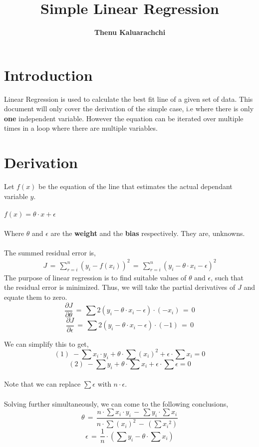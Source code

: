 \documentclass{article}
\title{\textbf{Simple Linear Regression}}
\author{\textbf{Thenu Kaluarachchi}}
\date{}
\begin{document}
\maketitle

\section{Introduction}
\noindent
Linear Regression is used to calculate the best fit line of a given set of data. This document will only cover the derivation of the simple case, i.e where there is only \textbf{one} independent variable. However the equation can be iterated over multiple times in a loop where there are multiple variables.

\section{Derivation}
Let $f(x)$ be the equation of the line that estimates the actual dependant variable $y$.
\\\\
\begin{math}
f(x) = \theta\cdot x + \epsilon
\end{math}
\\\\
Where $\theta$ and $\epsilon$ are the \textbf{weight} and the \textbf{bias} respectively. They are, unknowns.
\\\\
The summed residual error is,
\begin{align}
    J\, = \, \sum_{r=i}^n{(y_i-f(x_i))^2}\,=\, \sum_{r=i}^n{(y_i - \theta\cdot x_i - \epsilon)^2}
\end{align}
The purpose of linear regression is to find suitable values of $\theta$ and $\epsilon$, such that the residual error is minimized. Thus, we will take the partial derivatives of $J$ and equate them to zero.
$$
    \frac{\partial J}{\partial \theta}\, = \, \sum{2(y_i -\theta\cdot x_i - \epsilon)\cdot (-x_i)}\, = \,0 
$$
$$
    \frac{\partial J}{\partial \epsilon}\, = \, \sum{2(y_i -\theta\cdot x_i - \epsilon)\cdot (-1)}\, = \,0
    
$$

We can simplify this to get,
$$
(1)\; -\sum{x_i\cdot y_i} + \theta\cdot\sum{(x_i)^2} + \epsilon \cdot \sum{x_i} = 0
$$
$$
(2)\; -\sum{ y_i} + \theta\cdot\sum{x_i} + \epsilon \cdot \sum{\epsilon} = 0
$$
\newpage
\noindent
\noindent\\
Note that we can replace $\sum{\epsilon}$ with $n\cdot\epsilon$.\\\\
Solving further simultaneously, we can come to the following conclusions,
$$
\theta\, = \, \frac{n\cdot\sum{x_i\cdot y_i} \, - \, \sum{y_i}\cdot\sum{x_i}}{n
\cdot\sum{(x_i)^2}\, - \, (\sum{x_i}^2)}
$$
$$
\epsilon \, = \, \frac{1}{n}\cdot (\sum{y_i} - {\theta\cdot\sum{x_i}})
$$
\end{document}
